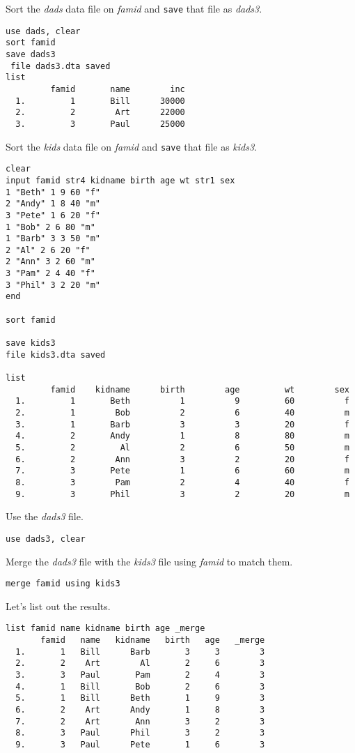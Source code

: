 \begin{compactenum}
\item Sort the \textit{dads} data file on \textit{famid} and \lstinline{save} that file as \textit{dads3}.
\begin{lstlisting}
use dads, clear
sort famid
save dads3
 file dads3.dta saved
list
         famid       name        inc
  1.         1       Bill      30000
  2.         2        Art      22000
  3.         3       Paul      25000
\end{lstlisting}
\item Sort the \textit{kids} data file on \textit{famid} and \lstinline{save} that file as \textit{kids3}.
\begin{lstlisting}
clear
input famid str4 kidname birth age wt str1 sex
1 "Beth" 1 9 60 "f"
2 "Andy" 1 8 40 "m"
3 "Pete" 1 6 20 "f"
1 "Bob" 2 6 80 "m"
1 "Barb" 3 3 50 "m"
2 "Al" 2 6 20 "f"
2 "Ann" 3 2 60 "m"
3 "Pam" 2 4 40 "f"
3 "Phil" 3 2 20 "m"
end

sort famid

save kids3
file kids3.dta saved

list
         famid    kidname      birth        age         wt        sex
  1.         1       Beth          1          9         60          f
  2.         1        Bob          2          6         40          m
  3.         1       Barb          3          3         20          f
  4.         2       Andy          1          8         80          m
  5.         2         Al          2          6         50          m
  6.         2        Ann          3          2         20          f
  7.         3       Pete          1          6         60          m
  8.         3        Pam          2          4         40          f
  9.         3       Phil          3          2         20          m
\end{lstlisting}
\item Use the \textit{dads3} file.
\begin{lstlisting}
use dads3, clear
\end{lstlisting}
\item Merge the \textit{dads3} file with the \textit{kids3} file using \textit{famid} to match them.
\begin{lstlisting}
merge famid using kids3
\end{lstlisting}
\end{compactenum}

Let's list out the results.

\begin{lstlisting}
list famid name kidname birth age _merge
       famid   name   kidname   birth   age   _merge
  1.       1   Bill      Barb       3     3        3
  2.       2    Art        Al       2     6        3
  3.       3   Paul       Pam       2     4        3
  4.       1   Bill       Bob       2     6        3
  5.       1   Bill      Beth       1     9        3
  6.       2    Art      Andy       1     8        3
  7.       2    Art       Ann       3     2        3
  8.       3   Paul      Phil       3     2        3
  9.       3   Paul      Pete       1     6        3
\end{lstlisting}

